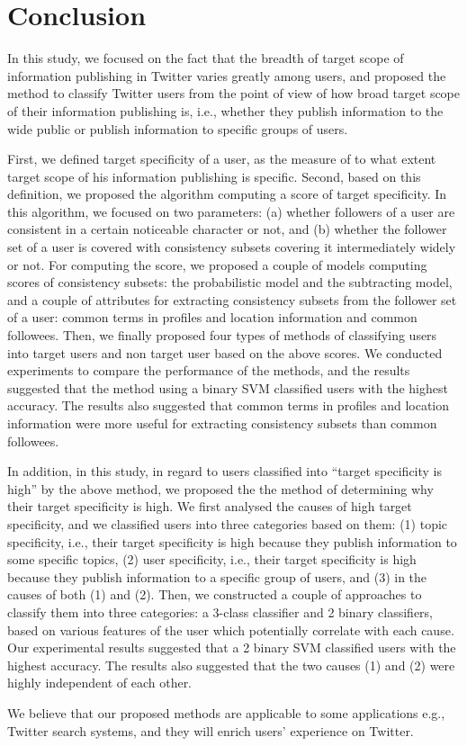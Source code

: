 \section{Conclusion}
\label{sec:Conclusion}

In this study, we focused on the fact that the breadth of target scope of
information publishing in Twitter varies greatly among users, and
proposed the method to classify Twitter
users from the point of view of how broad target scope of their
information publishing is, i.e., whether they publish information to the
wide public or publish information to specific groups of users.

First, we defined target specificity of a user, as the
measure of to what extent target scope of his information publishing is
specific.  Second, based on this definition, we proposed the algorithm
computing a score of target specificity.  In this algorithm, we
focused on two parameters: (a) whether followers of a user are
consistent in a certain noticeable character or not, and (b) whether the
follower set of a user is covered with consistency subsets covering it
intermediately widely or not.
For computing the score, we proposed a couple of models computing
scores of consistency subsets: the
probabilistic model and the subtracting model, and a couple of
attributes for extracting consistency subsets from the follower set of a
user: common terms in profiles and location information and common
followees.
Then, we finally proposed four types of methods of classifying users
into target users and non target user based on the above scores.  We conducted
experiments to compare the performance of the methods, and the results
suggested that the method using a binary SVM classified users with the
highest accuracy.  The results also suggested that common terms in profiles
and location information were more useful for extracting consistency
subsets than common followees.

In addition, in this study, in regard to users classified into
``target specificity is high'' by the above method, we proposed the
the method of determining why their target
specificity is high.  We first analysed the causes of high target
specificity, and we classified users into three
categories based on them: (1) topic specificity, i.e., their target
specificity is high because they publish information to some specific topics,
(2) user specificity, i.e., their target specificity is high because
they publish information to a specific group of users, and
(3) in the causes of both (1) and (2).  Then, we constructed
a couple of approaches to classify them into three categories: a 3-class
classifier and 2 binary classifiers, based on various features of the
user which potentially correlate with each cause.  Our experimental
results suggested that a 2 binary SVM classified users with the highest
accuracy. The results also suggested that the two causes (1) and (2)
were highly independent of each other.

We believe that our proposed methods are applicable to some applications
e.g., Twitter search systems, and they will enrich users' experience on
Twitter.